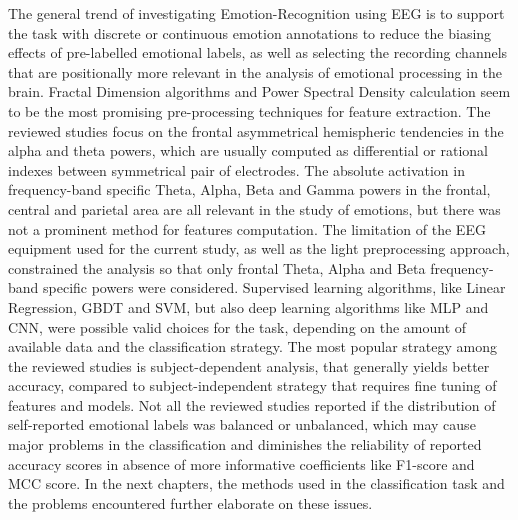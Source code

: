 The general trend of investigating Emotion-Recognition using \ac{EEG} is to support the task with discrete or continuous emotion annotations to reduce the biasing effects of pre-labelled emotional labels, as well as selecting the recording channels that are positionally more relevant in the analysis of emotional processing in the brain. Fractal Dimension algorithms and Power Spectral Density calculation seem to be the most promising pre-processing techniques for feature extraction. The reviewed studies focus on the frontal asymmetrical hemispheric tendencies in the alpha and theta powers, which are usually computed as differential or rational indexes between symmetrical pair of electrodes. The absolute activation in frequency-band specific Theta, Alpha, Beta and Gamma powers in the frontal, central and parietal area are all relevant in the study of emotions, but there was not a prominent method for features computation. The limitation of the \ac{EEG} equipment used for the current study, as well as the light preprocessing approach, constrained the analysis so that only frontal Theta, Alpha and Beta frequency-band specific powers were considered. Supervised learning algorithms, like Linear Regression, \ac{GBDT} and \ac{SVM}, but also deep learning algorithms like \ac{MLP} and \ac{CNN}, were possible valid choices for the task, depending on the amount of available data and the classification strategy. The most popular strategy among the reviewed studies is subject-dependent analysis, that generally yields better accuracy, compared to subject-independent strategy that requires fine tuning of features and models. Not all the reviewed studies reported if the distribution of self-reported emotional labels was balanced or unbalanced, which may cause major problems in the classification and diminishes the reliability of reported accuracy scores in absence of more informative coefficients like F1-score and \ac{MCC} score. In the next chapters, the methods used in the classification task and the problems encountered further elaborate on these issues.





